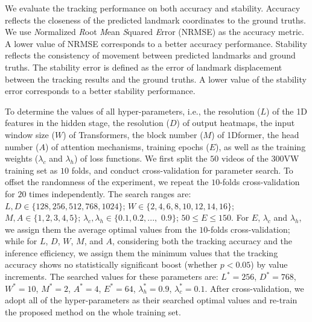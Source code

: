 \documentclass[review]{elsarticle}
\begin{document}
We evaluate the tracking performance on both accuracy and stability. Accuracy reflects the closeness of the predicted landmark coordinates to the ground truths. We use \textit{N}ormalized \textit{R}oot \textit{M}ean \textit{S}quared \textit{E}rror (NRMSE) \cite{300w} as the accuracy metric. A lower value of NRMSE corresponds to a better accuracy performance.
Stability reflects the consistency of movement between predicted landmarks and ground truths. The stability error \cite{tai2018towards} is defined as the error of landmark displacement between the tracking results and the ground truths. A lower value of the stability error corresponds to a better stability performance.

To determine the values of all hyper-parameters, i.e.,  the resolution ($L$) of the 1D features in the hidden stage, the resolution ($D$) of output heatmaps, the input window size ($W$) of Transformers, the block number ($M$) of 1Dformer, the head number ($A$) of attention mechanisms, training epochs ($E$), as well as the training weights ($\lambda_c$ and $\lambda_h$) of loss functions. We first split the $50$ videos of the 300VW training set as $10$ folds, and conduct cross-validation for parameter search. To offset the randomness of the experiment, we repeat the $10$-folds cross-validation for $20$ times independently. The search ranges are: $L,D \in \{128, 256, 512, 768, 1024\}$; $W \in \{2, 4, 6, 8, 10, 12,14,16\}$; $M, A \in \{1, 2, 3, 4, 5\}$; $\lambda_c, \lambda_h \in \{0.1, 0.2, ...,$ $ 0.9\}$; $50\leq E \leq 150$. For $E$, $\lambda_c$ and $\lambda_h$, we assign them the average optimal values from the $10$-folds cross-validation; while for $L$, $D$, $W$, $M$, and $A$, considering both the tracking accuracy and the inference efficiency, we assign them the minimum values 
that the tracking accuracy shows no statistically significant boost (whether $p<0.05$) by value increments. The searched values for these parameters are: $L^{*}=256$, $D^*=768$, $W^*=10$, $M^*=2$, $A^*=4$, $E^*=64$, $\lambda^*_h=0.9$, $\lambda^*_c=0.1$. After cross-validation, we adopt all of the hyper-parameters as their searched optimal values and re-train the proposed method on the whole training set. 
\end{document}
